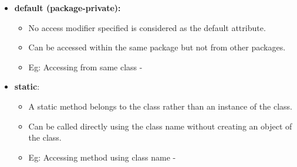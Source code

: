 \begin{flushleft}
\begin{itemize}
\begin{itemize}
			
		\end{itemize}
		\bigskip
		\item \textbf{default (package-private):} 
		\begin{itemize}
			\item No access modifier specified is considered as the default attribute. 
			\item Can be accessed within the same package but not from other packages.
			\item Eg: Accessing from same class -
			\bigskip
			\bigskip
		\end{itemize}
		
		\bigskip
		\item \textbf{static}:
		\begin{itemize}
			\item A static method belongs to the class rather than an instance of the class. 
			\item  Can be called directly using the class name without creating an object of the class.
			\item Eg: Accessing method using class name -
			\bigskip
			\bigskip
		\end{itemize}
		

\end{itemize}
\end{flushleft}
